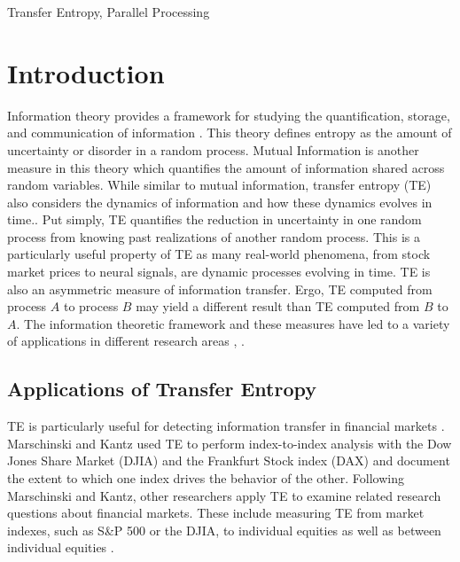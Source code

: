\documentclass[conference]{IEEEtran}
\begin{document}
\begin{IEEEkeywords}
Transfer Entropy, Parallel Processing
\end{IEEEkeywords}

\section{Introduction}

Information theory provides a framework for studying the quantification, storage, and communication of information \cite{InfoTheoryApplications}.  This theory defines entropy as the amount of uncertainty or disorder in a random process. Mutual Information is another measure in this theory which quantifies the amount of information shared across random variables. While similar to mutual information, transfer entropy (TE) also considers the dynamics of information and how these dynamics evolves in time.\cite{IntroToTransferEntropy}. Put simply, TE quantifies the reduction in uncertainty in one random process from knowing past realizations of another random process. This is a particularly useful property of TE as many real-world phenomena, from stock market prices to neural signals, are dynamic processes evolving in time. TE is also an asymmetric measure of information transfer. Ergo, TE computed from process \(A\) to process \(B\) may yield a different result than TE computed from \(B\) to \(A\). The information theoretic framework and these measures have led to a variety of applications in different research areas \cite{InfoTheoryApplications}, \cite{TEBook}.


\subsection{Applications of Transfer Entropy}

TE is particularly useful for detecting information transfer in financial markets \cite{TEBook}. Marschinski and Kantz used TE to perform index-to-index analysis with the Dow Jones Share Market (DJIA) and the Frankfurt Stock index (DAX) \cite{FinAppTE} and document the extent to which one index drives the behavior of the other. Following Marschinski and Kantz, other researchers apply TE to examine related research questions about financial markets. These include measuring TE from market indexes, such as S\&P 500 or the DJIA, to individual equities as well as between individual equities \cite{TEBook}.
\end{document}
